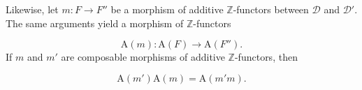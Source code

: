 Likewise, let $m\colon F\to F''$ be a morphism of additive
$\mathbb Z$-functors between $\mathcal D$ and $\mathcal D'$. The same
arguments yield a morphism of $\mathbb Z$-functors

\[
\mathrm A(m)\colon\mathrm A(F)\longrightarrow\mathrm A(F'').
\tag{3.1.4.4}
\]
If $m$ and $m'$ are composable morphisms of additive $\mathbb Z$-functors,
then

\[
\mathrm A(m')\mathrm A(m)=\mathrm A(m'm).
\tag{3.1.4.5}
\]
\endgroup
